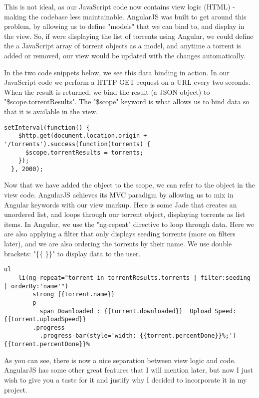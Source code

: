 This is not ideal, as our JavaScript code now contains view logic (HTML) - making the codebase less maintainable. AngularJS was built to get around this problem, by allowing us to define "models" that we can bind to, and display in the view. So, if were displaying the list of torrents using Angular, we could define the a JavaScript array of torrent objects as a model, and anytime a torrent is added or removed, our view would be updated with the changes automatically. 

In the two code snippets below, we see this data binding in action. In our JavaScript code we perform a HTTP GET request on a URL every two seconds. When the result is returned, we bind the result (a JSON object) to "\$scope.torrentResults". The "\$scope" keyword is what allows us to bind data so that it is available in the view.

\vspace{20px}
\begin{lstlisting}[caption=AngularJS binding data with \$scope keyword]
  setInterval(function() {
    $http.get(document.location.origin + '/torrents').success(function(torrents) {
      $scope.torrentResults = torrents;
    });
  }, 2000);
\end{lstlisting}


Now that we have added the object to the scope, we can refer to the object in the view code. AngularJS achieves its MVC paradigm by allowing us to mix in Angular keywords with our view markup. Here is some Jade that creates an unordered list, and loops through our torrent object, displaying torrents as list items. In Angular, we use the "ng-repeat" directive to loop through data. Here we are also applying a filter that only displays seeding torrents (more on filters later), and we are also ordering the torrents by their name. We use double brackets: "\{\{ \}\}" to display data to the user.

\vspace{20px}
\begin{lstlisting}[caption=Jade with AngularJS]
 ul
 	li(ng-repeat="torrent in torrentResults.torrents | filter:seeding | orderBy:'name'")
    	strong {{torrent.name}}
        p
          span Downloaded : {{torrent.downloaded}}  Upload Speed: {{torrent.uploadSpeed}}
        .progress
          .progress-bar(style='width: {{torrent.percentDone}}%;') {{torrent.percentDone}}%
\end{lstlisting}


As you can see, there is now a nice separation between view logic and code. AngularJS has some other great features that I will mention later, but now I just wish to give you a taste for it and justify why I decided to incorporate it in my project.


